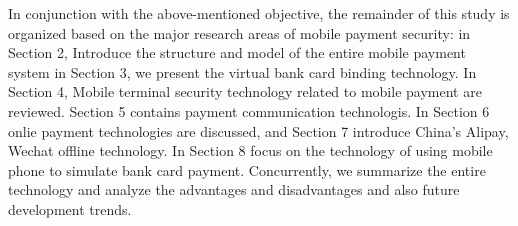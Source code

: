 \documentclass[journal]{IEEEtran}
\begin{document}
In conjunction with the above-mentioned objective, the remainder of this study is organized based on the major research areas of mobile payment security: in Section 2, Introduce the structure and model of the entire mobile payment system
in Section 3, we present the virtual bank card binding technology. In Section 4, Mobile terminal security technology related to mobile payment are reviewed. Section 5 contains payment communication technologis. In Section 6 onlie payment technologies are discussed, and Section 7 introduce China's Alipay, Wechat offline technology. In Section 8 focus on the technology of using mobile phone to simulate bank card payment. Concurrently, we summarize the entire technology and analyze the advantages and disadvantages and also future development trends.

\end{document}
